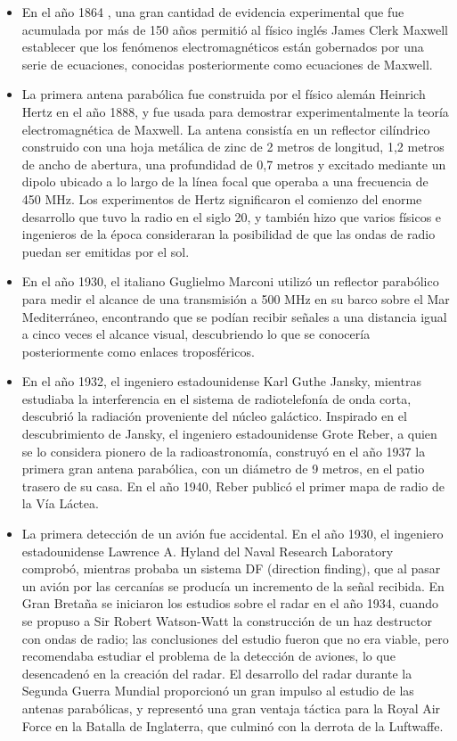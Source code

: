 \begin{itemize}
\item En el año 1864 \cite{Baars}, una gran cantidad de evidencia experimental que fue acumulada por más de 150 años permitió al físico inglés James Clerk Maxwell establecer que los fenómenos electromagnéticos están gobernados por una serie de ecuaciones, conocidas posteriormente como ecuaciones de Maxwell.
\item La primera antena parabólica fue construida por el físico alemán Heinrich Hertz en el año 1888, y fue usada para demostrar experimentalmente la teoría electromagnética de Maxwell. La antena consistía en un reflector cilíndrico construido con una hoja metálica de zinc de 2 metros de longitud, 1,2 metros de ancho de abertura, una profundidad de 0,7 metros y excitado mediante un dipolo ubicado a lo largo de la línea focal que operaba a una frecuencia de 450 MHz. Los experimentos de Hertz significaron el comienzo del enorme desarrollo que tuvo la radio en el siglo 20, y también hizo que varios físicos e ingenieros de la época consideraran la posibilidad de que las ondas de radio puedan ser emitidas por el sol.
\item En el año 1930, el italiano Guglielmo Marconi utilizó un reflector parabólico para medir el alcance de una transmisión a 500 MHz en su barco sobre el Mar Mediterráneo, encontrando que se podían recibir señales a una distancia igual a cinco veces el alcance visual, descubriendo lo que se conocería posteriormente como enlaces troposféricos.
\item En el año 1932, el ingeniero estadounidense Karl Guthe Jansky, mientras estudiaba la interferencia en el sistema de radiotelefonía de onda corta, descubrió la radiación proveniente del núcleo galáctico. Inspirado en el descubrimiento de Jansky, el ingeniero estadounidense Grote Reber, a quien se lo considera pionero de la radioastronomía, construyó en el año 1937 la primera gran antena parabólica, con un diámetro de 9 metros, en el patio trasero de su casa. En el año 1940, Reber publicó el primer mapa de radio de la Vía Láctea.
\item La primera detección de un avión fue accidental. En el año 1930, el ingeniero estadounidense Lawrence A. Hyland del Naval Research Laboratory comprobó, mientras probaba un sistema DF (direction finding), que al pasar un avión por las cercanías se producía un incremento de la señal recibida. En Gran Bretaña se iniciaron los estudios sobre el radar  en el año 1934, cuando se propuso a Sir Robert Watson-Watt la construcción de un haz destructor con ondas de radio; las conclusiones del estudio fueron que no era viable, pero recomendaba estudiar el problema de la detección de aviones, lo que desencadenó en la creación del radar. El desarrollo del radar durante la Segunda Guerra Mundial proporcionó un gran impulso al estudio de las antenas parabólicas, y representó una gran ventaja táctica para la Royal Air Force en la Batalla de Inglaterra, que culminó con la derrota de la Luftwaffe.

\end{itemize}
